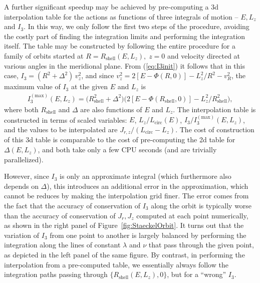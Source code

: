 \documentclass[12pt]{article}
\begin{document}
A further significant speedup may be achieved by pre-computing a 3d interpolation table for the actions as functions of three integrals of motion -- $E, L_z$ and $I_3$. In this way, we only follow the first two steps of the procedure, avoiding the costly part of finding the integration limits and performing the integration itself. The table may be constructed by following the entire procedure for a family of orbits started at $R=R_\mathrm{shell}(E,L_z),\; z=0$ and velocity directed at various angles in the meridional plane. From (\ref{eq:I3init}) it follows that in this case, $I_3 = (R^2+\Delta^2)\,v_z^2$, and since $v_z^2 = 2[E-\Phi(R,0)] - L_z^2/R^2 - v_R^2$, the maximum value of $I_3$ at the given $E$ and $L_z$ is
\begin{align}
I_3^{\mathrm{(max)}}(E, L_z) = \big( R_\mathrm{shell}^2 + \Delta^2 \big)
\big( 2[E-\Phi(R_\mathrm{shell},0)] - L_z^2/R_\mathrm{shell}^2 \big),
\end{align}
where both $R_\mathrm{shell}$ and $\Delta$ are also functions of $E$ and $L_z$.
The interpolation table is constructed in terms of scaled variables: $E$, $L_z / L_\mathrm{circ}(E)$, $I_3 / I_3^{\mathrm{(max)}}(E, L_z)$, and the values to be interpolated are $J_{r,z} / (L_\mathrm{circ}-L_z)$. The cost of construction of this 3d table is comparable to the cost of pre-computing the 2d table for $\Delta(E,L_z)$, and both take only a few CPU seconds (and are trivially parallelized).

However, since $I_3$ is only an approximate integral (which furthermore also depends on $\Delta$), this introduces an additional error in the approximation, which cannot be reduces by making the interpolation grid finer. The error comes from the fact that the accuracy of conservation of $I_3$ along the orbit is typically worse than the accuracy of conservation of $J_r,J_z$ computed at each point numerically, as shown in the right panel of Figure~\ref{fig:StaeckelOrbit}. It turns out that the variation of $I_3$ from one point to another is largely balanced by performing the integration along the lines of constant $\lambda$ and $\nu$ that pass through the given point, as depicted in the left panel of the same figure. By contrast, in performing the interpolation from a pre-computed table, we essentially always follow the integration paths passing through $\{R_\mathrm{shell}(E,L_z),0\}$, but for a ``wrong'' $I_3$.
\end{document}
